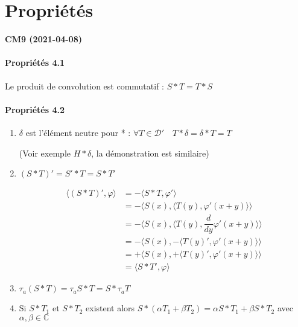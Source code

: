 \documentclass[12pt,a4paper]{report}
\newcommand{\ens}[1]{\ensuremath{\mathbb{#1}}}
\newcommand{\D}{\ensuremath{\mathcal{D}}}
\begin{document}
\section{Propriétés}

\begin{center}
\textbf{CM9 (2021-04-08)}
\end{center}

\paragraph{Propriétés 4.1} \quad

Le produit de convolution est commutatif : \( S * T = T * S\)

\paragraph{Propriétés 4.2} \quad

\begin{enumerate}


	\item \(\delta\) est l'élément neutre pour * : \(\forall T \in \D' \quad T * \delta = \delta * T = T\)

	(Voir exemple \( H * \delta\), la démonstration est similaire)

	\item \(\left ( S * T \right )' = S' * T = S * T'\)
	
	\begin{align*}
		\langle \left ( S * T \right )', \varphi \rangle &= - \langle S*T, \varphi' \rangle \\
		&= - \langle S(x), \langle T(y), \varphi'(x+y) \rangle \rangle\\
		&= - \langle S(x), \langle T(y), \dfrac{d}{dy} \varphi'(x+y) \rangle \rangle\\
		&= - \langle S(x), - \langle T(y)', \varphi'(x+y) \rangle \rangle\\
		&= + \langle S(x), + \langle T(y)', \varphi'(x+y) \rangle \rangle\\
		&= \langle S * T', \varphi \rangle
	\end{align*}

	\item \(\tau_a ( S * T) = \tau_a S * T = S * \tau_a T\)
	
	\item Si \(S * T_1\) et \(S * T_2\) existent alors \(S * \left ( \alpha T_1 + \beta T_2 \right  ) = \alpha S * T_1 + \beta S * T_2\) avec \(\alpha, \beta \in \ens{C}\)

\end{enumerate}
\end{document}
